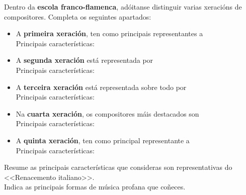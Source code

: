 \begin{ejercicio}
Dentro da \textbf{escola franco-flamenca}, adóitanse distinguir varias xeracións de compositores. Completa os seguintes apartados:
\begin{multicols}{2}

\begin{itemize}
    \item A \textbf{primeira xeración}, ten como principais representantes a \dotfill \\
    Principais características: 
    \par
    \vspace*{2.5cm}
    \item  A \textbf{segunda xeración} está representada por \dotfill \\
    Principais características: 
    \par
    \vspace*{2.5cm}
    \item A \textbf{terceira xeración} está representada sobre todo por \dotfill \\ 
    Principais características:
    \par
    \vspace*{2.5cm}
    \item  Na \textbf{cuarta xeración}, os compositores máis destacados son \dotfill \\
    Principais características:
    \par
    \vspace*{2.5cm}
    \item  A \textbf{quinta xeración}, ten como principal representante a \dotfill \\
    Principais características:
    \par
    \vspace*{2cm}    
\end{itemize}
\end{multicols}
\end{ejercicio}

\begin{ejercicio}
Resume as principais características que consideras son representativas do <<Renacemento italiano>>.\\
Indica as principais formas de música profana que coñeces.
\par
\vspace{9cm}
\end{ejercicio}

